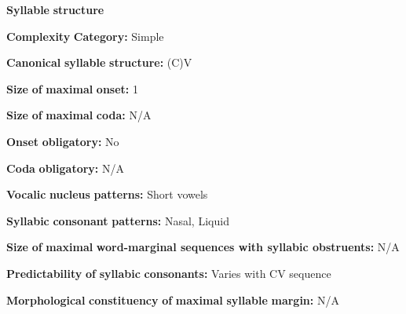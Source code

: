 \documentclass[output=paper]{langsci/langscibook}
\begin{document}
\begin{styleBody}
\textbf{Syllable} \textbf{structure}
\end{styleBody}

\begin{styleBody}
\textbf{Complexity} \textbf{Category:} Simple
\end{styleBody}

\begin{styleBody}
\textbf{Canonical} \textbf{syllable} \textbf{structure:} (C)V \citep[30-2]{Gerner2013}
\end{styleBody}

\begin{styleBody}
\textbf{Size} \textbf{of} \textbf{maximal} \textbf{onset:} 1
\end{styleBody}

\begin{styleBody}
\textbf{Size} \textbf{of} \textbf{maximal} \textbf{coda:} N/A
\end{styleBody}

\begin{styleBody}
\textbf{Onset} \textbf{obligatory:} No
\end{styleBody}

\begin{styleBody}
\textbf{Coda} \textbf{obligatory:} N/A
\end{styleBody}

\begin{styleBody}
\textbf{Vocalic} \textbf{nucleus} \textbf{patterns:} Short vowels
\end{styleBody}

\begin{styleBody}
\textbf{Syllabic} \textbf{consonant} \textbf{patterns:} Nasal, Liquid
\end{styleBody}

\begin{styleBody}
\textbf{Size} \textbf{of} \textbf{maximal} \textbf{word{}-marginal sequences with syllabic obstruents:} N/A
\end{styleBody}

\begin{styleBody}
\textbf{Predictability} \textbf{of} \textbf{syllabic} \textbf{consonants:} Varies with CV sequence
\end{styleBody}

\begin{styleBody}
\textbf{Morphological} \textbf{constituency} \textbf{of} \textbf{maximal} \textbf{syllable} \textbf{margin:} N/A
\end{styleBody}
\end{document}
